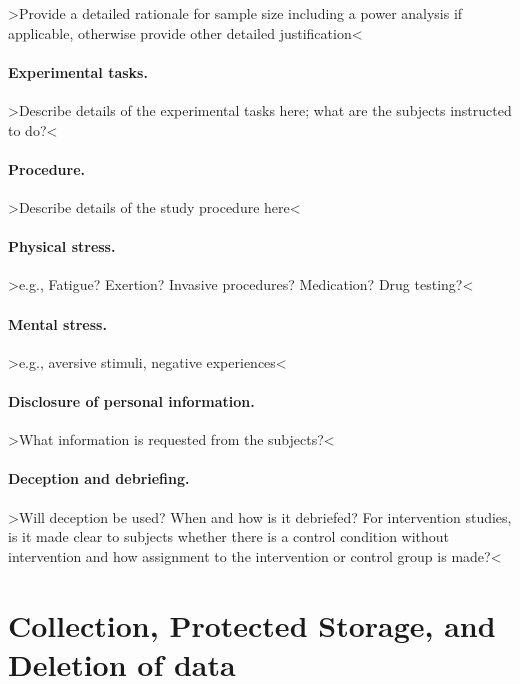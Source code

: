 \documentclass[11pt,twoside,a4paper]{article}
\begin{document}
>Provide a detailed rationale for sample size including a power analysis if applicable, otherwise provide other detailed justification<

\paragraph{Experimental tasks.}

>Describe details of the experimental tasks here; what are the subjects instructed to do?<

\paragraph{Procedure.}

>Describe details of the study procedure here<

\paragraph{Physical stress.}

>e.g., Fatigue? Exertion? Invasive procedures? Medication? Drug testing?<

\paragraph{Mental stress.}

>e.g., aversive stimuli, negative experiences<

\paragraph{Disclosure of personal information.}

>What information is requested from the subjects?<

\paragraph{Deception and debriefing.}

>Will deception be used? When and how is it debriefed?
For intervention studies, is it made clear to subjects whether there is a control condition without intervention and how assignment to the intervention or control group is made?<

\section{Collection, Protected Storage, and Deletion of data}
\end{document}
